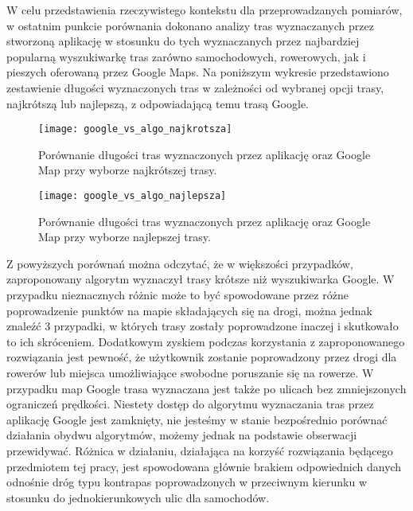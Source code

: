 W celu przedstawienia rzeczywistego kontekstu dla przeprowadzanych pomiarów, w ostatnim punkcie porównania dokonano analizy tras wyznaczanych przez stworzoną aplikację w stosunku do tych wyznaczanych przez najbardziej popularną wyszukiwarkę tras zarówno samochodowych, rowerowych, jak i pieszych oferowaną przez Google Maps. Na poniższym wykresie przedstawiono zestawienie długości wyznaczonych tras w zależności od wybranej opcji trasy, najkrótszą lub najlepszą, z odpowiadającą temu trasą Google.

\begin{figure}[H]
\centering
\texttt{[image: google\_vs\_algo\_najkrotsza]}
\caption{Porównanie długości tras wyznaczonych przez aplikację oraz Google Map przy wyborze najkrótszej trasy.}
\end{figure}

\begin{figure}[H]
\centering
\texttt{[image: google\_vs\_algo\_najlepsza]}
\caption{Porównanie długości tras wyznaczonych przez aplikację oraz Google Map przy wyborze najlepszej trasy.}
\end{figure}

Z powyższych porównań można odczytać, że w większości przypadków, zaproponowany algorytm wyznaczył trasy krótsze niż wyszukiwarka Google. W przypadku nieznacznych różnic może to być spowodowane przez różne poprowadzenie punktów na mapie składających się na drogi, można jednak znaleźć 3 przypadki, w których trasy zostały poprowadzone inaczej i skutkowało to ich skróceniem. Dodatkowym zyskiem podczas korzystania z zaproponowanego rozwiązania jest pewność, że użytkownik zostanie poprowadzony przez drogi dla rowerów lub miejsca umożliwiające swobodne poruszanie się na rowerze. W przypadku map Google trasa wyznaczana jest także po ulicach bez zmniejszonych ograniczeń prędkości. Niestety dostęp do algorytmu wyznaczania tras przez aplikację Google jest zamknięty, nie jesteśmy w stanie bezpośrednio porównać działania obydwu algorytmów, możemy jednak na podstawie obserwacji przewidywać. Różnica w działaniu, działająca na korzyść  rozwiązania będącego przedmiotem tej pracy, jest spowodowana głównie brakiem odpowiednich danych odnośnie dróg typu kontrapas poprowadzonych w przeciwnym kierunku w stosunku do jednokierunkowych ulic dla samochodów.